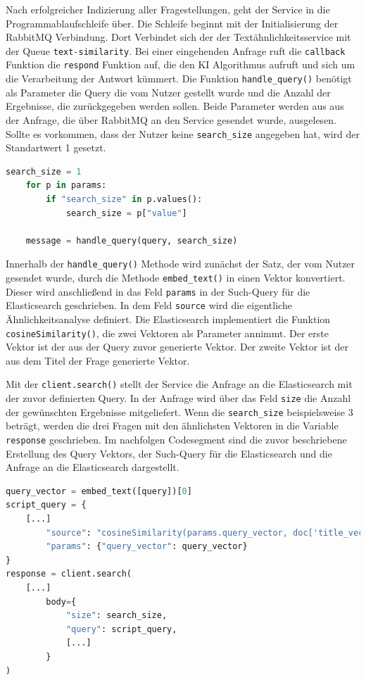 Nach erfolgreicher Indizierung aller Fragestellungen, geht der Service in die Programmablaufschleife über. Die Schleife beginnt mit der Initialisierung der RabbitMQ Verbindung. Dort Verbindet sich der der Textähnlichkeitsservice mit der Queue \texttt{text-similarity}. Bei einer eingehenden Anfrage ruft die \texttt{callback} Funktion die \texttt{respond} Funktion auf, die den KI Algorithmus aufruft und sich um die Verarbeitung der Antwort kümmert. Die Funktion \texttt{handle\_{}query()} benötigt als Parameter die Query die vom Nutzer gestellt wurde und die Anzahl der Ergebnisse, die zurückgegeben werden sollen. Beide Parameter werden aus aus der Anfrage, die über RabbitMQ an den Service gesendet wurde, ausgelesen. Sollte es vorkommen, dass der Nutzer keine \texttt{search\_{}size} angegeben hat, wird der Standartwert 1 gesetzt.
 
\begin{lstlisting}[language=Python]
search_size = 1
    for p in params:
        if "search_size" in p.values():
            search_size = p["value"]

    message = handle_query(query, search_size)
\end{lstlisting}

Innerhalb der \texttt{handle\_{}query()} Methode wird zunächst der Satz, der vom Nutzer gesendet wurde, durch die Methode \texttt{embed\_{}text()} in einen Vektor konvertiert. Dieser  wird anschließend in das Feld \texttt{\glqq params\grqq{}} in der Such-Query für die Elasticsearch geschrieben. In dem Feld \texttt{\glqq source\grqq{}} wird die eigentliche Ähnlichkeitsanalyse definiert. Die Elasticsearch implementiert die Funktion \texttt{cosineSimilarity()}, die zwei Vektoren als Parameter annimmt. Der erste Vektor ist der  aus der Query zuvor generierte Vektor. Der zweite Vektor ist der aus dem Titel der Frage generierte Vektor. 

Mit der \texttt{client.search()} stellt der Service die Anfrage an die Elasticsearch mit der zuvor definierten Query. In der Anfrage wird über das Feld \texttt{\glqq size\grqq} die Anzahl der gewünschten Ergebnisse mitgeliefert. Wenn die \texttt{search\_{}size} beispielsweise 3 beträgt, werden die drei Fragen mit den ähnlichsten Vektoren in die Variable \texttt{response} geschrieben. Im nachfolgen Codesegment sind die zuvor beschriebene Erstellung des Query Vektors, der Such-Query für die Elasticsearch und die Anfrage an die Elasticsearch dargestellt.

\begin{lstlisting}[language=Python]
query_vector = embed_text([query])[0]
script_query = {
    [...]
        "source": "cosineSimilarity(params.query_vector, doc['title_vector']) + 1.0",
        "params": {"query_vector": query_vector}  
}
response = client.search(
    [...]
        body={
            "size": search_size,
            "query": script_query,
            [...]
        }
)
\end{lstlisting}

